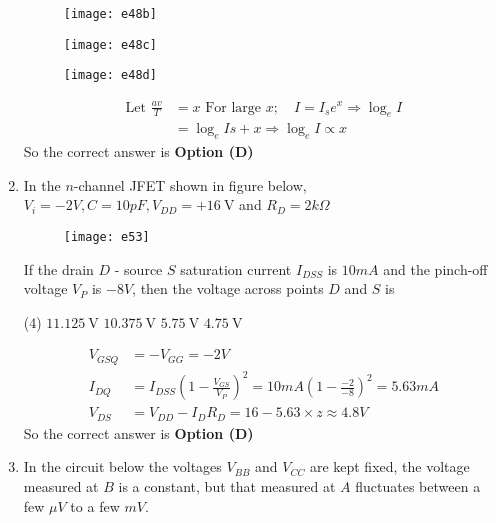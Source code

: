\begin{enumerate}
\begin{tasks}
\begin{figure}[H]
	\centering
	\texttt{[image: e48b]}
\end{figure}
\task[\textbf{C.}] \begin{figure}[H]
	\centering
	\texttt{[image: e48c]}
\end{figure}
\task[\textbf{D.}] \begin{figure}[H]
	\centering
	\texttt{[image: e48d]}
\end{figure}
\end{tasks}
\begin{answer}
\begin{align*}
\text{Let }\frac{a v}{T}&=x\text{ For large }x ; \quad I=I_{s} e^{x} \Rightarrow \log _{e} I\\&=\log _{e} I s+x \Rightarrow \log _{e} I \propto x
\end{align*}
So the correct answer is \textbf{Option (D)}
\end{answer}
	\item In the $n$-channel JFET shown in figure below, $V_{i}=-2 V, C=10 p F, V_{D D}=+16 \mathrm{~V}$ and $R_{D}=2 k \Omega$\\
	\begin{figure}[H]
		\centering
		\texttt{[image: e53]}
	\end{figure}
	If the drain $D$ - source $S$ saturation current $I_{D S S}$ is $10 m A$ and the pinch-off voltage $V_{P}$ is $-8 V$, then the voltage across points $D$ and $S$ is
{	}
\begin{tasks}(4)
\task[\textbf{A.}] $11.125 \mathrm{~V}$
\task[\textbf{B.}] $10.375 \mathrm{~V}$
\task[\textbf{C.}] $5.75 \mathrm{~V}$
\task[\textbf{D.}] $4.75 \mathrm{~V}$
\end{tasks}
\begin{answer}
\begin{align*}
V_{G S Q}&=-V_{G G}=-2 V\\
I_{D Q}&=I_{D S S}\left(1-\frac{V_{G S}}{V_{P}}\right)^{2}=10 m A\left(1-\frac{-2}{-8}\right)^{2}=5.63 m A\\
V_{D S}&=V_{D D}-I_{D} R_{D}=16-5.63 \times z \approx 4.8 V
\end{align*}
So the correct answer is \textbf{Option (D)}
\end{answer}
	\item In the circuit below the voltages $V_{B B}$ and $V_{C C}$ are kept fixed, the voltage measured at $B$ is a constant, but that measured at $A$ fluctuates between a few $\mu V$ to a few $m V$.\\

\end{enumerate}
